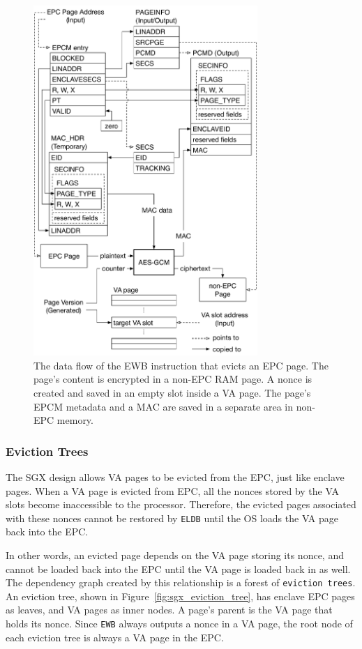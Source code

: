 \begin{figure}[hbt!]
  \centering
  \includegraphics[width=85mm]{figures/sgx_ewb.pdf}
  \caption{
    The data flow of the EWB instruction that evicts an EPC page. The page's
    content is encrypted in a non-EPC RAM page. A nonce is created and saved
    in an empty slot inside a VA page. The page's EPCM metadata and a MAC
    are saved in a separate area in non-EPC memory.
  }
  \label{fig:sgx_ewb}
\end{figure}




\subsubsection{Eviction Trees}
\label{sec:sgx_eviction_trees}

The SGX design allows VA pages to be evicted from the EPC, just like enclave
pages. When a VA page is evicted from EPC, all the nonces stored by the VA
slots become inaccessible to the processor. Therefore, the evicted pages
associated with these nonces cannot be restored by \texttt{ELDB} until the
OS loads the VA page back into the EPC.

In other words, an evicted page depends on the VA page storing its nonce, and
cannot be loaded back into the EPC until the VA page is loaded back in as well.
The dependency graph created by this relationship is a forest of
\texttt{eviction trees}. An eviction tree, shown in
Figure~\ref{fig:sgx_eviction_tree}, has enclave EPC pages as leaves, and VA
pages as inner nodes. A page's parent is the VA page that holds its nonce.
Since \texttt{EWB} always outputs a nonce in a VA page, the root node of each
eviction tree is always a VA page in the EPC.

